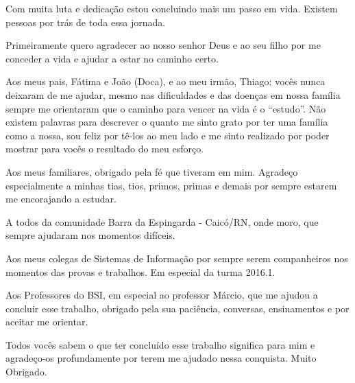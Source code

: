 \begin{agradecimentos}
   Com muita luta e dedicação estou concluindo mais um passo em vida. Existem pessoas por trás de toda essa jornada. 
   
   Primeiramente quero agradecer ao nosso senhor Deus e ao seu filho por me conceder a vida e ajudar a estar no caminho certo.
   
   Aos meus pais, Fátima e João (Doca), e ao meu irmão, Thiago: vocês nunca deixaram de me ajudar, mesmo nas dificuldades e das doenças em nossa família sempre me orientaram que o caminho para vencer na vida é o “estudo”. Não existem palavras para descrever o quanto me sinto grato por ter uma família como a nossa, sou feliz por tê-los ao meu lado e me sinto realizado por poder mostrar para vocês o resultado do meu esforço.
  
   Aos meus familiares, obrigado pela fé que tiveram em mim. Agradeço especialmente a minhas tias, tios, primos, primas e demais por sempre estarem me encorajando a estudar.
   
   A todos da comunidade Barra da Espingarda - Caicó/RN, onde moro, que sempre ajudaram nos momentos difíceis.

   Aos meus colegas de Sistemas de Informação por sempre serem companheiros nos momentos das provas e trabalhos. Em especial da turma 2016.1.

   Aos Professores do BSI, em especial ao professor Márcio, que me ajudou a concluir esse trabalho, obrigado pela sua paciência, conversas, ensinamentos e por aceitar me orientar.
   
   Todos vocês sabem o que ter concluído esse trabalho significa para mim e agradeço-os profundamente por terem me ajudado nessa conquista. Muito Obrigado.
   
\end{agradecimentos}